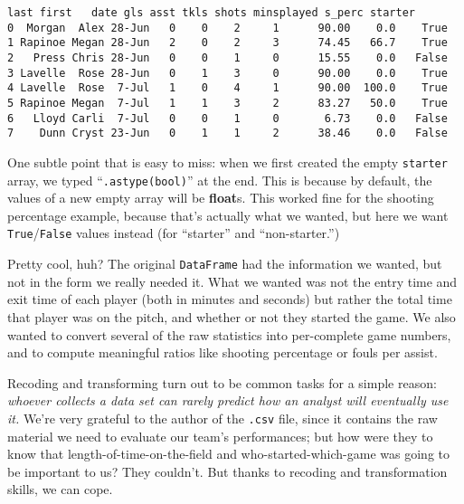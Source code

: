 \begin{Verbatim}[fontsize=\scriptsize,samepage=true,frame=leftline,framesep=5mm,framerule=1mm]
     last first   date gls asst tkls shots minsplayed s_perc starter
0  Morgan  Alex 28-Jun   0    0    2     1      90.00    0.0    True
1 Rapinoe Megan 28-Jun   2    0    2     3      74.45   66.7    True
2   Press Chris 28-Jun   0    0    1     0      15.55    0.0   False
3 Lavelle  Rose 28-Jun   0    1    3     0      90.00    0.0    True
4 Lavelle  Rose  7-Jul   1    0    4     1      90.00  100.0    True
5 Rapinoe Megan  7-Jul   1    1    3     2      83.27   50.0    True
6   Lloyd Carli  7-Jul   0    0    1     0       6.73    0.0   False
7    Dunn Cryst 23-Jun   0    1    1     2      38.46    0.0   False
\end{Verbatim}


One subtle point that is easy to miss: when we first created the empty
\texttt{starter} array, we typed ``\texttt{.astype(bool)}'' at the end. This is
because by default, the values of a new empty array will be \textbf{float}s.
This worked fine for the shooting percentage example, because that's actually
what we wanted, but here we want \texttt{True}/\texttt{False} values instead
(for ``starter'' and ``non-starter.'')

Pretty cool, huh? The original \texttt{DataFrame} had the information we
wanted, but not in the form we really needed it. What we wanted was not the
entry time and exit time of each player (both in minutes and seconds) but
rather the total time that player was on the pitch, and whether or not they
started the game. We also wanted to convert several of the raw statistics into
per-complete game numbers, and to compute meaningful ratios like shooting
percentage or fouls per assist.

\bigskip

Recoding and transforming turn out to be common tasks for a simple reason:
\textit{whoever collects a data set can rarely predict how an analyst will
eventually use it.} We're very grateful to the author of the \texttt{.csv}
file, since it contains the raw material we need to evaluate our team's
performances; but how were they to know that length-of-time-on-the-field and
who-started-which-game was going to be important to us? They couldn't. But
thanks to recoding and transformation skills, we can cope.

